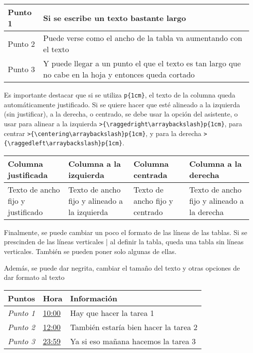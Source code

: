 \begin{center}
	\begin{tabular}{|p{2cm}|p{10cm}|}
	\hline 
	Punto 1 & Si se escribe un texto bastante largo \\ 
	\hline 
	Punto 2 & Puede verse como el ancho de la tabla va aumentando con el texto \\ 
	\hline 
	Punto 3 & Y puede llegar a un punto el que el texto es tan largo que no cabe en la hoja y entonces queda cortado \\ 
	\hline 
\end{tabular} 
\end{center}

Es importante destacar que si se utiliza \verb!p{1cm}!, el texto de la columna queda automáticamente justificado. Si se quiere hacer que esté alineado a la izquierda (sin justificar), a la derecha, o centrado, se debe usar la opción del asistente, o usar para alinear a la izquierda \verb!>{\raggedright\arraybackslash}p{1cm}!, para centrar \verb!>{\centering\arraybackslash}p{1cm}!, y para la derecha \verb!>{\raggedleft\arraybackslash}p{1cm}!.

\begin{center}
	\begin{tabular}{|p{2.5cm}|>{\raggedright\arraybackslash}p{2.5cm}|>{\centering\arraybackslash}p{2.5cm}|>{\raggedleft\arraybackslash}p{2.5cm}|}
	\hline 
	Columna justificada & Columna a la izquierda & Columna centrada & Columna a la derecha \\ 
	\hline 
	Texto de ancho fijo y justificado & Texto de ancho fijo y alineado a la izquierda & Texto de ancho fijo y centrado & Texto de ancho fijo y alineado a la derecha \\ 
	\hline 
\end{tabular} 
\end{center}

Finalmente, se puede cambiar un poco el formato de las líneas de las tablas. Si se prescinden de las líneas verticales | al definir la tabla, queda una tabla sin líneas verticales. También se pueden poner solo algunas de ellas.

Además, se puede dar negrita, cambiar el tamaño del texto y otras opciones de dar formato al texto

\begin{center}
	\begin{tabular}{ p{2cm} | p{1cm} | p{10cm} }
		\cellcolor[HTML]{EFEFEF}\textbf{Puntos} & \cellcolor[HTML]{EFEFEF}\textbf{Hora} & \cellcolor[HTML]{EFEFEF}\textbf{Información} \\
		\hline 
		\textit{Punto 1} & \underline{10:00} & Hay que hacer la tarea 1 \\ 
		\hline 
		\textit{Punto 2} & \underline{12:00} &  También estaría bien hacer la tarea 2 \\ 
		\hline 
		\textit{Punto 3} & \underline{23:59} & Ya si eso mañana hacemos la tarea 3 \newline {\scriptsize Ya si eso} \\ 
	\end{tabular} 
\end{center}

